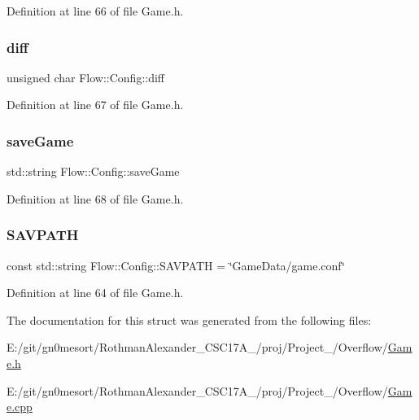 Definition at line 66 of file Game.\+h.

\hypertarget{struct_flow_1_1_config_a0ea347143bb4a8156d1c54871aca1084}{}\label{struct_flow_1_1_config_a0ea347143bb4a8156d1c54871aca1084} 
\subsubsection{\texorpdfstring{diff}{diff}}
{\footnotesize\ttfamily unsigned char Flow\+::\+Config\+::diff}



Definition at line 67 of file Game.\+h.

\hypertarget{struct_flow_1_1_config_ae9c7f4511035a6c6dbf177435d8835c3}{}\label{struct_flow_1_1_config_ae9c7f4511035a6c6dbf177435d8835c3} 
\subsubsection{\texorpdfstring{save\+Game}{saveGame}}
{\footnotesize\ttfamily std\+::string Flow\+::\+Config\+::save\+Game}



Definition at line 68 of file Game.\+h.

\hypertarget{struct_flow_1_1_config_ab720407eb6a5120f4ae3923cd00e2b30}{}\label{struct_flow_1_1_config_ab720407eb6a5120f4ae3923cd00e2b30} 
\subsubsection{\texorpdfstring{S\+A\+V\+P\+A\+TH}{SAVPATH}}
{\footnotesize\ttfamily const std\+::string Flow\+::\+Config\+::\+S\+A\+V\+P\+A\+TH = \char`\"{}Game\+Data/game.\+conf\char`\"{}\hspace{0.3cm}{\ttfamily [static]}}



Definition at line 64 of file Game.\+h.



The documentation for this struct was generated from the following files\+:\begin{DoxyCompactItemize}
\item 
E\+:/git/gn0mesort/\+Rothman\+Alexander\+\_\+\+C\+S\+C17\+A\+\_/proj/\+Project\+\_/\+Overflow/\hyperlink{_game_8h}{Game.\+h}\item 
E\+:/git/gn0mesort/\+Rothman\+Alexander\+\_\+\+C\+S\+C17\+A\+\_/proj/\+Project\+\_/\+Overflow/\hyperlink{_game_8cpp}{Game.\+cpp}\end{DoxyCompactItemize}
